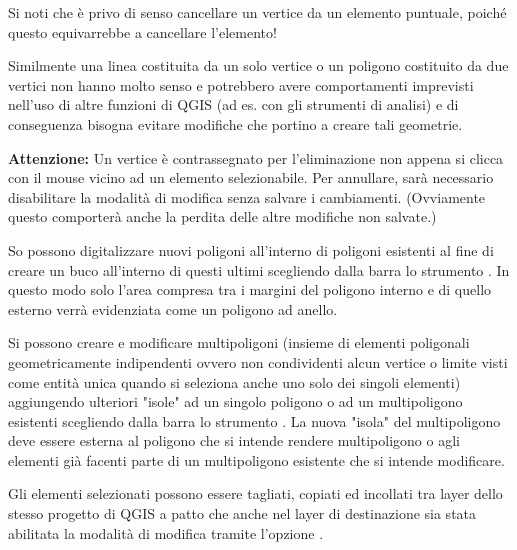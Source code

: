 Si noti che è privo di senso cancellare un vertice da un elemento puntuale,
poiché questo equivarrebbe a cancellare l'elemento!

Similmente una linea costituita da un solo vertice o un poligono costituito da
due vertici non hanno molto senso e potrebbero avere comportamenti imprevisti
nell'uso di altre funzioni di QGIS (ad es. con gli strumenti di analisi) e di
conseguenza bisogna evitare modifiche che portino a creare tali geometrie.

\textbf{Attenzione:} Un vertice è contrassegnato per l'eliminazione non appena
si clicca con il mouse vicino ad un elemento selezionabile. Per annullare,
sarà necessario disabilitare la modalità di modifica senza salvare i
cambiamenti. (Ovviamente questo comporterà anche la perdita delle altre
modifiche non salvate.)


So possono digitalizzare nuovi poligoni all'interno di poligoni esistenti al fine
di creare un buco all'interno di questi ultimi scegliendo dalla barra lo
strumento .
In questo modo solo l'area compresa tra i margini del poligono interno e di
quello esterno verrà evidenziata come un poligono ad anello. 


Si possono creare e modificare multipoligoni (insieme di elementi poligonali
geometricamente indipendenti ovvero non condividenti alcun vertice o limite
visti come entità unica quando si seleziona anche uno solo dei singoli
elementi) aggiungendo ulteriori "isole" ad
un singolo poligono o ad un multipoligono esistenti scegliendo dalla barra lo
strumento . La nuova "isola"
del multipoligono deve essere esterna al poligono che si intende rendere
multipoligono o agli elementi già facenti parte di un multipoligono esistente
che si intende modificare. 


Gli elementi selezionati possono essere tagliati, copiati ed incollati
tra layer dello stesso progetto di QGIS a patto che anche nel layer di destinazione
sia stata abilitata la modalità di modifica tramite l'opzione 
.

